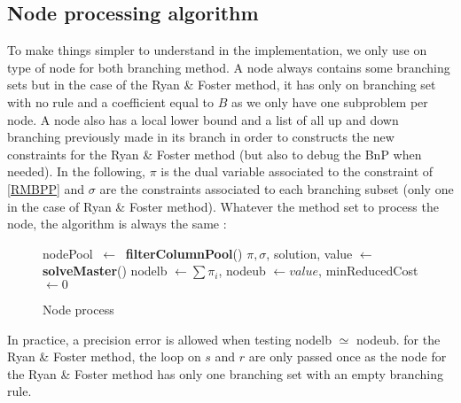\subsection{Node processing algorithm}
\label{node-process}

To make things simpler to understand in the implementation, we only use on type of node for both branching method. A node always contains some branching sets but in the case of the Ryan \& Foster method, it has only on branching set with no rule and a coefficient equal to $B$ as we only have one subproblem per node. A node also has a local lower bound and a list of all up and down branching previously made in its branch in order to constructs the new constraints for the Ryan \& Foster method (but also to debug the BnP when needed). In the following, $\pi$ is the dual variable associated to the constraint of \eqref{RMBPP} and $\sigma$ are the constraints associated to each branching subset (only one in the case of Ryan \& Foster method). Whatever the method set to process the node, the algorithm is always the same :
\begin{figure}[!ht]
	\centering
	\begin{minipage}[t]{0.7\linewidth}
		\begin{algorithm}[H]
			\DontPrintSemicolon 
			nodePool $\ \leftarrow \ $ \textbf{filterColumnPool}()\;
			$\pi, \sigma$, solution, value $ \leftarrow$ \textbf{solveMaster}()\;
			nodelb $\leftarrow \sum \pi_i$, nodeub $\leftarrow value$, minReducedCost $\leftarrow 0$\;
			
			\caption{Node process}
		\end{algorithm}
	\end{minipage}
\end{figure}

In practice, a precision error is allowed when testing nodelb $\simeq$ nodeub. for the Ryan \& Foster method, the loop on $s$ and $r$ are only passed once as the node for the Ryan \& Foster method has only one branching set with an empty branching rule.
